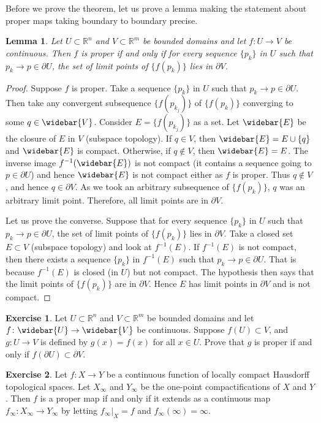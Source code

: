 \documentclass[12pt,openany]{book}
\newcommand{\R}{{\mathbb{R}}}
\theoremstyle{plain}
\newtheorem{lemma}[thm]{Lemma}
\theoremstyle{remark}
\theoremstyle{definition}
\newenvironment{exbox}{%
    \def\FrameCommand{\vrule width 1pt \relax\hspace{10pt}}%
    \MakeFramed{\advance\hsize-\width\FrameRestore}%
}{%
    \endMakeFramed
}
\theoremstyle{exercise}
\newtheorem{exercise}{Exercise}[section]
\theoremstyle{example}
\begin{document}
Before we prove the theorem, let us prove a lemma making the statement about
proper maps taking boundary to boundary precise.

\begin{lemma} \label{lemma:bndrytobndry}
Let $U \subset \R^n$ and $V \subset \R^m$ be bounded domains and
let $f \colon U \to V$ be continuous.
Then $f$ is proper if and only if
for every sequence $\{ p_k \}$ in $U$ such that $p_k \to p \in \partial U$,
the set of limit points of $\bigl\{ f(p_k) \bigr\}$ lies in $\partial V$.
\end{lemma}

\begin{proof}
Suppose $f$ is proper.  Take a 
sequence $\{ p_k \}$ in $U$ such that $p_k \to p \in \partial U$.
Then take any convergent subsequence $\bigl\{ f(p_{k_j}) \bigr\}$ of
$\bigl\{ f(p_k) \bigr\}$
converging to some $q \in \widebar{V}$.  Consider
$E = \bigl\{ f(p_{k_j}) \bigr\}$ as a set.  Let $\widebar{E}$ be the closure of $E$
in $V$ (subspace topology).  If $q \in V$, then $\widebar{E} = E \cup \{ q
\}$ and $\widebar{E}$ is compact.
Otherwise, if $q \notin V$, then
$\widebar{E} = E$.
The inverse image $f^{-1}(\widebar{E})$
is not compact (it contains a sequence going to $p \in \partial U$)
and hence $\widebar{E}$ is not
compact either as $f$ is proper.  Thus $q \notin V$, and hence $q \in
\partial V$.  As we took an arbitrary subsequence of $\bigl\{ f(p_k) \bigr\}$, $q$ was
an arbitrary limit point.  Therefore, all limit points are in $\partial V$.

Let us prove the converse.
Suppose that for every sequence
$\{ p_k \}$ in $U$ such that $p_k \to p \in \partial U$,
the set of limit points of $\bigl\{ f(p_k) \bigr\}$ lies in $\partial V$.
Take a closed set $E \subset V$ (subspace topology) and look at $f^{-1}(E)$.  If $f^{-1}(E)$
is not compact, then there exists a sequence $\{ p_k \}$ in $f^{-1}(E)$
such that $p_k \to p \in \partial U$.  That is because $f^{-1}(E)$ is closed
(in $U$) but not compact.  The hypothesis then says that the limit points of
$\bigl\{ f(p_k) \bigr\}$ are in $\partial V$.  Hence $E$ has limit points in
$\partial V$ and is not compact.
\end{proof}

\begin{exbox}
\begin{exercise}
Let $U \subset \R^n$ and $V \subset \R^m$ be bounded domains and
let $f \colon \widebar{U} \to \widebar{V}$ be continuous.
Suppose $f(U) \subset V$, and $g \colon U \to V$ is defined by
$g(x) = f(x)$ for all $x \in U$.
Prove that $g$ is proper if and only if $f(\partial U) \subset \partial V$.
\end{exercise}

\begin{exercise}
Let $f \colon X \to Y$ be a continuous function of locally compact Hausdorff topological spaces.
Let $X_\infty$ and $Y_\infty$ be the 
one-point compactifications of $X$ and $Y$.
Then $f$ is a proper map if and only if it extends as a continuous map
$f_\infty \colon X_\infty \to Y_\infty$ by letting
$f_\infty |_X = f$ and
 $f_\infty(\infty) = \infty$.
\end{exercise}
\end{exbox}
\end{document}
